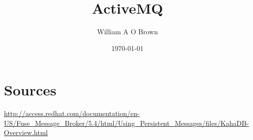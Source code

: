 \documentclass[a4paper,10pt]{article}
\begin{document}
\title{ActiveMQ}
\author{William A O Brown}
\date{\today}
\maketitle

\tableofcontents
\listoffigures

% 






\section{Sources}
\url{http://access.redhat.com/documentation/en-US/Fuse_Message_Broker/5.4/html/Using_Persistent_Messages/files/KahaDB-Overview.html}


\end{document}
